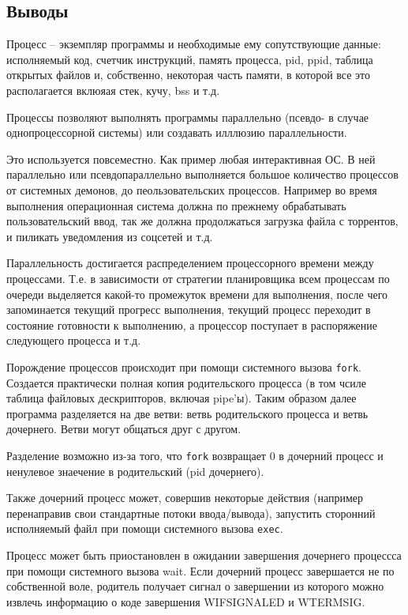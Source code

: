 \documentclass[12pt]{article}
\begin{document}
\subsection*{Выводы}

Процесс -- экземпляр программы и необходимые ему сопутствующие данные: исполняемый код, счетчик инструкций, память процесса, pid, ppid, таблица открытых файлов и, собственно, некоторая часть памяти, в которой все это располагается вклюяая стек, кучу, bss и т.д.

Процессы позволяют выполнять программы параллельно (псевдо- в случае однопроцессорной системы) или создавать илллюзию параллельности.

Это используется повсеместно. Как пример любая интерактивная ОС. В ней параллельно или псевдопараллельно выполняется большое количество процессов от системных демонов, до пеользовательских процессов.
Например во время выполнения операционная система должна по прежнему обрабатывать пользовательский ввод, так же должна продолжаться загрузка файла с торрентов, и пиликать уведомления из соцсетей и т.д. 

Параллельность достигается распределением процессорного времени между процессами. Т.е. в зависимости от стратегии планировщика всем процессам по очереди выделяется какой-то промежуток времени для выполнения, после чего запоминается текущий прогресс выполнения, текущий процесс переходит в состояние готовности к выполнению, а процессор поступает в распоряжение следующего процесса и т.д.

Порождение процессов происходит при помощи системного вызова \verb|fork|. Создается практически полная копия родительского процесса (в том чсиле таблица файловых дескрипторов, включая pipe'ы). Таким образом далее программа разделяется на две ветви: ветвь родительского процесса и ветвь дочернего. Ветви могут общаться друг с другом.

Разделение возможно из-за того, что \verb|fork| возвращает $0$ в дочерний процесс и ненулевое знаечение в родительский (pid дочернего).

Также дочерний процесс может, совершив некоторые действия (например перенаправив свои стандартные потоки ввода/вывода), запустить сторонний исполняемый файл при помощи системного вызова \verb|exec|.

Процесс может быть приостановлен в ожидании завершения дочернего процессса при помощи системного вызова wait.
Если дочерний процесс завершается не по собственной воле, родитель получает сигнал о завершении из которого можно извлечь информацию о коде завершения WIFSIGNALED и WTERMSIG.
\end{document}

